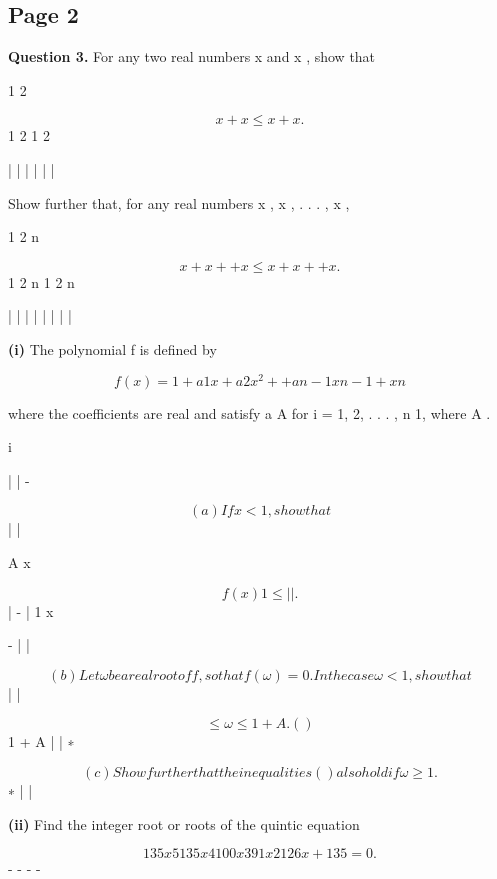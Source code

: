 \documentclass[12pt]{article}
\begin{document}
\subsection*{Page 2}
\begin{flushleft}
\bigskip\textbf{Question 3.} For any two real numbers x and x , show that\par
1 2\par
\[x + x \leq x + x .\]
1 2 1 2\par
| | | | | |\par
Show further that, for any real numbers x , x , . . . , x ,\par
1 2 n\par
\[x + x + + x \leq x + x + + x .\]
1 2 n 1 2 n\par
| \cdots | | | | | \cdots | |\par
\textbf{(i)} The polynomial f is defined by\par
\[f(x) = 1 + a 1 x + a 2 x^2 + + a n-1 xn-1 + xn\]
\cdots\par
where the coefficients are real and satisfy a \leq A for i = 1, 2, . . . , n 1, where A  .\par
i\par
| | -\par
\[(a) If x < 1, show that\]
| |\par
A x\par
\[f(x) 1 \leq | | .\]
| - | 1 x\par
- | |\par
\[(b) Let ω be a real root of f, so that f(ω) = 0 . In the case ω < 1, show that\]
| |\par
\[\leq ω \leq 1 + A. ( )\]
1 + A | | ∗\par
\[(c) Show further that the inequalities ( ) also hold if ω \geq 1.\]
∗ | |\par
\textbf{(ii)} Find the integer root or roots of the quintic equation\par
\[135x5 135x4 100x3 91x2 126x + 135 = 0.\]
- - - -\par
\end{flushleft}
\end{document}
